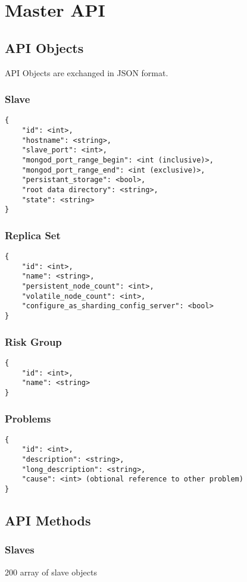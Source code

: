 \section{Master API}
\subsection{API Objects}
API Objects are exchanged in JSON format.
\subsubsection{Slave}
\begin{lstlisting}
{
	"id": <int>,
	"hostname": <string>,
	"slave_port": <int>,
	"mongod_port_range_begin": <int (inclusive)>,
	"mongod_port_range_end": <int (exclusive)>,
	"persistant_storage": <bool>,
	"root data directory": <string>,
	"state": <string>
}
\end{lstlisting}
\subsubsection{Replica Set}
\begin{lstlisting}
{
	"id": <int>,
	"name": <string>,
	"persistent_node_count": <int>,
	"volatile_node_count": <int>,
	"configure_as_sharding_config_server": <bool>
}
\end{lstlisting}
\subsubsection{Risk Group}
\begin{lstlisting}
{
	"id": <int>,
	"name": <string>
}
\end{lstlisting}
\subsubsection{Problems}
\begin{lstlisting}
{
	"id": <int>,
	"description": <string>,
	"long_description": <string>,
	"cause": <int> (obtional reference to other problem)
}
\end{lstlisting}
\subsection{API Methods}
\subsubsection{Slaves}
	{}
	{200}
	{}
	{array of slave objects}
	{}

